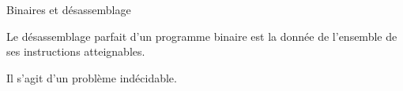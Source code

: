 \documentclass{beamer}
\begin{document}
\begin{frame}{Binaires et désassemblage}
\pause
\begin{defi}
 Le désassemblage parfait d'un programme binaire est la donnée de l'ensemble de ses instructions atteignables.
\end{defi}
Il s'agit d'un problème indécidable.
\end{frame}

\end{document}
